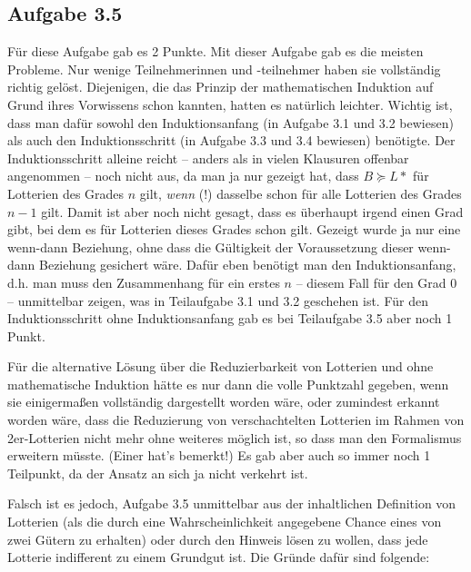 \documentclass[10pt, a4paper, german]{article}
\numberwithin {equation}{section}
\begin{document}
\subsection{Aufgabe 3.5}

Für diese Aufgabe gab es 2 Punkte. Mit dieser Aufgabe gab es die meisten
Probleme. Nur wenige Teilnehmerinnen und -teilnehmer haben sie vollständig
richtig gelöst. Diejenigen, die das Prinzip der mathematischen Induktion auf
Grund ihres Vorwissens schon kannten, hatten es natürlich leichter. Wichtig ist,
dass man dafür sowohl den Induktionsanfang (in Aufgabe 3.1 und 3.2 bewiesen) als
auch den Induktionsschritt (in Aufgabe 3.3 und 3.4 bewiesen) benötigte. Der
Induktionsschritt alleine reicht -- anders als in vielen Klausuren offenbar
angenommen -- noch nicht aus, da man ja nur gezeigt hat, dass $B \succeq L*$ für
Lotterien des Grades $n$ gilt, {\em wenn} (!) dasselbe schon für alle Lotterien
des Grades $n-1$ gilt. Damit ist aber noch nicht gesagt, dass es überhaupt irgend
einen Grad gibt, bei dem es für Lotterien dieses Grades schon gilt. Gezeigt wurde
ja nur eine wenn-dann Beziehung, ohne dass die Gültigkeit der Voraussetzung
dieser wenn-dann Beziehung gesichert wäre. Dafür eben benötigt man den
Induktionsanfang, d.h. man muss den Zusammenhang für ein erstes $n$ -- diesem
Fall für den Grad 0 -- unmittelbar zeigen, was in Teilaufgabe 3.1 und 3.2
geschehen ist. Für den Induktionsschritt ohne Induktionsanfang gab es bei
Teilaufgabe 3.5 aber noch 1 Punkt.

Für die alternative Lösung über die Reduzierbarkeit von Lotterien und ohne
mathematische Induktion hätte es nur dann die volle Punktzahl gegeben, wenn sie
einigermaßen vollständig dargestellt worden wäre, oder zumindest erkannt worden
wäre, dass die Reduzierung von verschachtelten Lotterien im Rahmen von
2er-Lotterien nicht mehr ohne weiteres möglich ist, so dass man den Formalismus
erweitern müsste. (Einer hat's bemerkt!) Es gab aber auch so immer noch 1
Teilpunkt, da der Ansatz an sich ja nicht verkehrt ist.

Falsch ist es jedoch, Aufgabe 3.5 unmittelbar aus der inhaltlichen Definition
von Lotterien (als die durch eine Wahrscheinlichkeit angegebene Chance eines von
zwei Gütern zu erhalten) oder durch den Hinweis lösen zu wollen, dass jede
Lotterie indifferent zu einem Grundgut ist. Die Gründe dafür sind folgende:
\end{document}
